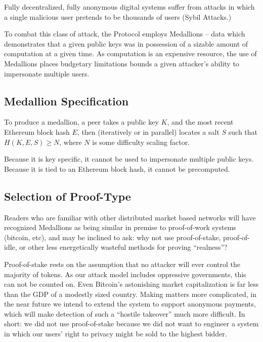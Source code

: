 
Fully decentralized, fully anonymous digital systems suffer from
attacks in which a single malicious user pretends to be thousands of
users (Sybil Attacks.)

To combat this class of attack, the \Orchid{} Protocol employs
Medallions -- data which demonstrates that a given public keys was in
possession of a sizable amount of computation at a given time. As
computation is an expensive resource, the use of Medallions places
budgetary limitations bounds a given attacker's ability to impersonate
multiple users.

\subsection{Medallion Specification}

To produce a medallion, a peer takes a public key $K$, and the most
recent Ethereum block hash $E$, then (iteratively or in parallel)
locates a salt $S$ such that $H(K, E, S) \geq N$, where $N$ is some
difficulty scaling factor.

Because it is key specific, it cannot be used to impersonate multiple
public keys. Because it is tied to an Ethereum block hash, it cannot
be precomputed.

\subsection{Selection of Proof-Type}

Readers who are familiar with other distributed market based networks will have recognized Medallions as being similar in premise to proof-of-work systems (bitcoin, etc), and may be inclined to ask: why not use proof-of-stake, proof-of-idle, or other less energetically wasteful methods for proving “realness”?

Proof-of-stake rests on the assumption that no attacker will ever control the majority of tokens. As our attack model includes oppressive governments, this can not be counted on. Even Bitcoin’s astonishing market capitalization is far less than the GDP of a modestly sized country. Making matters more complicated, in the near future we intend to extend the system to support anonymous payments, which will make detection of such a ``hostile takeover'' much more difficult. In short: we did not use proof-of-stake because we did not want to engineer a system in which our users’ right to privacy might be sold to the highest bidder.

